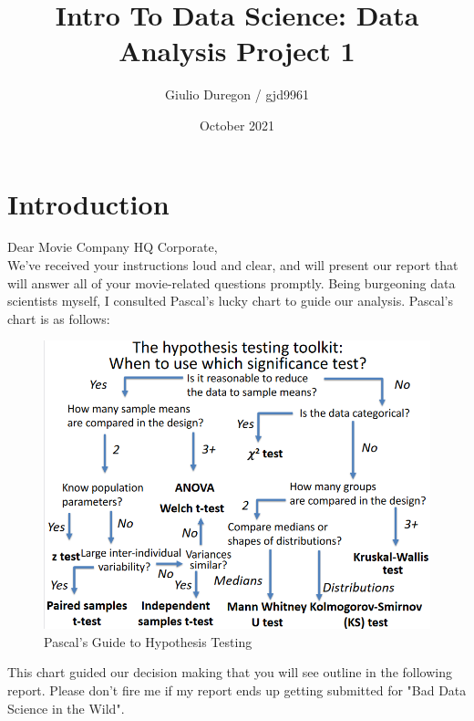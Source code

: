 \documentclass[12pt,twoside]{article}
\title{Intro To Data Science: Data Analysis Project 1}
\author{Giulio Duregon / gjd9961}
\date{October 2021}
\begin{document}
\maketitle

\section{Introduction}
Dear Movie Company HQ Corporate,\\

We've received your instructions loud and clear, and will present our report that will answer all of your movie-related questions promptly. Being burgeoning data scientists myself, I consulted Pascal's lucky chart to guide our analysis. Pascal's chart is as follows:

\begin{figure}[h!]
    \centering
    \includegraphics[scale=.6]{hypothesis testing.png}
    \caption{Pascal's Guide to Hypothesis Testing}
    \label{Pascal's Guide to Hypothesis Testing}
\end{figure}
This chart guided our decision making that you will see outline in the following report. Please don't fire me if my report ends up getting submitted for "Bad Data Science in the Wild".\\

\newpage 
\end{document}
